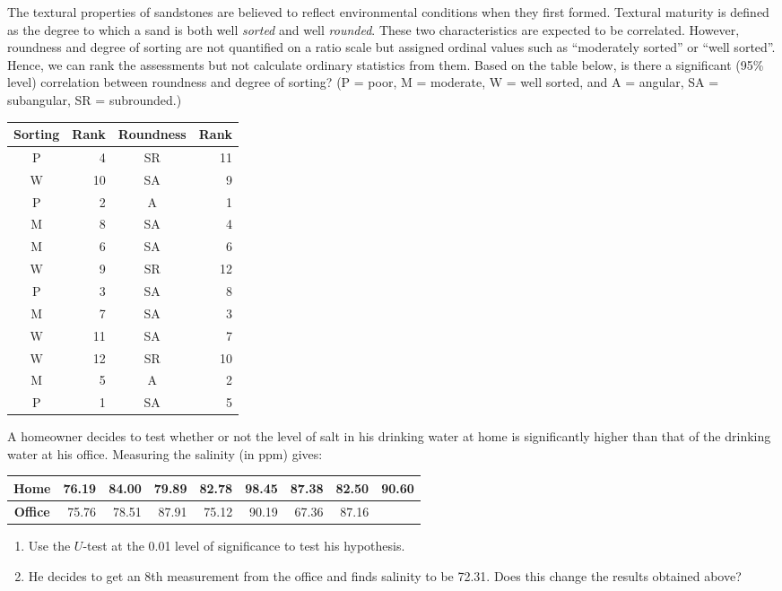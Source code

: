 \begin{problem}
The textural properties of sandstones are believed to reflect environmental 
conditions when they first formed.  Textural maturity is defined as the degree to which a sand is 
both well \emph{sorted} and well \emph{rounded}.  These two characteristics are expected to be correlated.  
However, roundness and degree of sorting are not quantified on a ratio scale but assigned ordinal 
values such as ``moderately sorted'' or ``well sorted''.  Hence, we can rank the assessments but not 
calculate ordinary statistics from them.  Based on the table below, is there a significant (95\% 
level) correlation between roundness and degree of sorting? (P = poor, M = moderate, W = well sorted,
and A = angular, SA = subangular, SR = subrounded.)
\begin{table}[H]
\centering
\begin{tabular}{|c|r|c|r|} \hline
\bf{Sorting} &  \bf{Rank} & \bf{Roundness} & \bf{Rank} \\ \hline \hline
P & 4  & SR & 11 \\ \hline
W & 10 & SA & 9  \\ \hline
P & 2  & A  & 1  \\ \hline
M & 8  & SA & 4  \\ \hline
M & 6  & SA & 6  \\ \hline
W & 9  & SR & 12 \\ \hline
P & 3  & SA & 8  \\ \hline
M & 7  & SA & 3  \\ \hline
W & 11 & SA & 7  \\ \hline
W & 12 & SR & 10 \\ \hline
M & 5  & A  & 2  \\ \hline
P & 1  & SA & 5  \\ \hline
\end{tabular}
\end{table}
\end{problem}

\begin{problem}
A homeowner decides to test whether or not the level of salt in his drinking water
at home is significantly higher than that of the drinking water at his office.  Measuring the salinity (in ppm) gives:
\begin{table}[H]
\centering
\begin{tabular}{|c||r|r|r|r|r|r|r|r|} \hline
\bf{Home}	& 76.19	& 84.00	& 79.89	& 82.78	& 98.45	& 87.38	& 82.50	& 90.60 \\ \hline
\bf{Office}	& 75.76	& 78.51	& 87.91	& 75.12	& 90.19	& 67.36	& 87.16	&       \\ \hline
\end{tabular}
\end{table}
\begin{enumerate}[label=\alph*)]
\item Use the $U$-test at the 0.01 level of significance to test his hypothesis.
\item He decides to get an 8th measurement from the office and finds salinity to be 72.31.
  Does this change the results obtained above?
\end{enumerate}
\end{problem}

